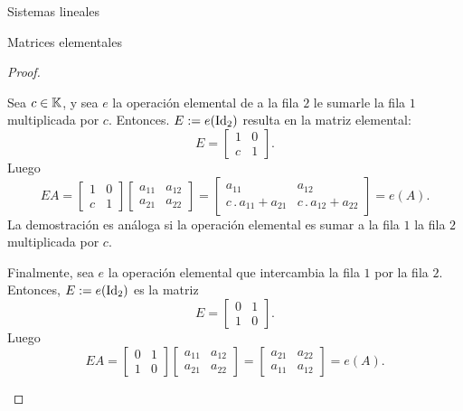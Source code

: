 \begin{chapter}{Sistemas lineales}
\begin{section}{Matrices elementales}
\begin{proof}
\begin{enumelem}
                    \item Sea  $c \in \mathbb K$, y  sea $e$ la operación elemental de a la fila $2$ le sumarle  la fila $1$ multiplicada por $c$. Entonces. $E:=e(\operatorname{Id}_2)$ resulta en la matriz elemental: 
                    \begin{equation*}
                    E=\begin{bmatrix} 1& 0\\ c&1\end{bmatrix}.
                    \end{equation*}
                    Luego 
                    \begin{equation*}
                    EA= \begin{bmatrix} 1& 0\\ c&1\end{bmatrix}	\begin{bmatrix} a_{11}&a_{12}\\a_{21}&a_{22}\end{bmatrix} = 
                    \begin{bmatrix} 
                    a_{11} &a_{12}\\
                    c\,.\,a_{11} + a_{21}&c\,.\,a_{12}+a_{22}\end{bmatrix} = e(A).
                    \end{equation*}
                    La demostración es análoga si la operación elemental es sumar a la fila $1$ la fila $2$ multiplicada por $c$.
                    
                    \item  Finalmente, sea $e$ la operación elemental que intercambia la fila $1$ por la fila $2$. Entonces,  $E:=e(\operatorname{Id}_2)$ es la matriz 
                    \begin{equation*}
                    E=\begin{bmatrix} 0& 1\\ 1&0\end{bmatrix}.
                    \end{equation*}
                    Luego
                    \begin{equation*}
                    EA= \begin{bmatrix} 0& 1\\ 1&0\end{bmatrix}	\begin{bmatrix} a_{11}&a_{12}\\a_{21}&a_{22}\end{bmatrix} = 
                    \begin{bmatrix}
                    a_{21} &a_{22}\\
                    a_{11} &a_{12}\end{bmatrix} = e(A).
                    \end{equation*}
                \end{enumelem}
                

\end{proof}
\end{section}
\end{chapter}
